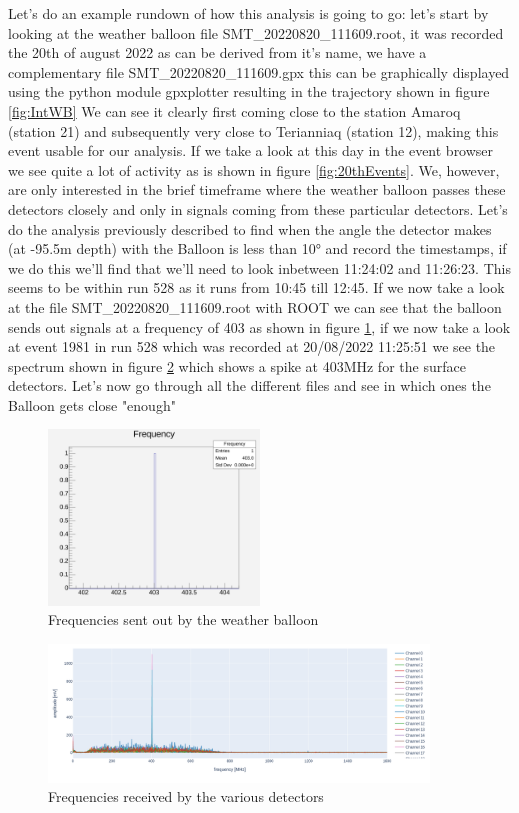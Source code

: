 \documentclass[11pt,a4paper,faculty=we,language=en,doctype=report]{cls/ugent-doc}
\begin{document}
Let's do an example rundown of how this analysis is going to go: let's start by
looking at the weather balloon file SMT\_20220820\_111609.root, it was recorded
the 20th of august 2022 as can be derived from it's name, we have a
complementary file SMT\_20220820\_111609.gpx this can be graphically displayed
using the python module gpxplotter resulting in the trajectory shown in figure
\ref{fig:IntWB} We can see it clearly first coming close to the station Amaroq
(station 21) and subsequently very close to Terianniaq (station 12), making
this event usable for our analysis.  If we take a look at this day in the event
browser we see quite a lot of activity as is shown in figure
\ref{fig:20thEvents}. We, however, are only interested in the brief timeframe
where the weather balloon passes these detectors closely and only in signals coming
from these particular detectors. Let's do the analysis previously described
to find when the angle the detector makes (at -95.5m depth) with the Balloon
is less than 10° and record the timestamps, if we do this we'll find that 
we'll need to look inbetween 11:24:02 and 11:26:23. This seems to be within
run 528 as it runs from 10:45 till 12:45. If we now take a look at the file 
SMT\_20220820\_111609.root with ROOT we can see that the balloon sends out signals at
a frequency of 403 as shown in figure \ref{fig:BalloonFreq}, if we now take a
look at event 1981 in run 528 which was recorded at 20/08/2022 11:25:51 we see
the spectrum shown in figure \ref{fig:DetectorFreq} which shows a spike at 403MHz for the surface
detectors.
Let's now go through all the different files and see in which ones the Balloon gets close "enough"
\begin{figure}
  \centering
  \includegraphics[width=0.5\textwidth]{Frequencies.pdf}
  \caption{Frequencies sent out by the weather balloon}
  \label{fig:BalloonFreq}
\end{figure}
\begin{figure}
  \centering
  \includegraphics[width=0.9\textwidth]{FrequenciesDetectors.png}
  \caption{Frequencies received by the various detectors}
  \label{fig:DetectorFreq}
\end{figure}
\end{document}
